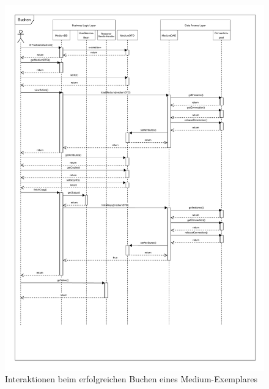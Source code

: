 \documentclass{article}
\begin{document}

\begin{figure}[h]
    \centering
    \includegraphics[width = 50em]{Sequenzdiagramm-success}
    \caption{Interaktionen beim erfolgreichen Buchen eines Medium-Exemplares}
    \label{Sequenzdiagramm}
\end{figure}

\restoregeometry
\newpage

\end{document}
